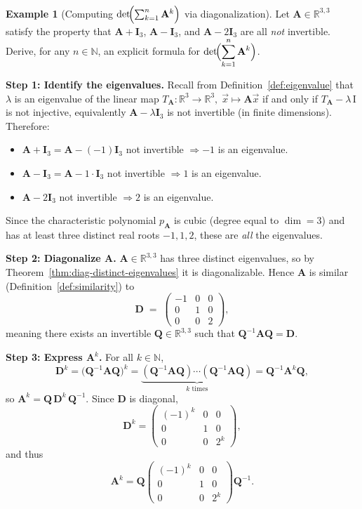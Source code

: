 \documentclass[11pt, a4paper, notitlepage]{report}
\theoremstyle{definition}
\newtheorem{example}[theorem]{Example}
\theoremstyle{remark}
\begin{document}
\begin{example}[Computing $\det\!\Bigl(\sum_{k=1}^n \mathbf{A}^k\Bigr)$ via diagonalization]
\label{ex:det-sum-diag}
Let $\mathbf{A} \in \mathbb{R}^{3,3}$ satisfy the property that
$\mathbf{A} + \mathbf{I}_3$, $\mathbf{A} - \mathbf{I}_3$, and
$\mathbf{A} - 2\mathbf{I}_3$ are all \emph{not} invertible.
Derive, for any $n \in \mathbb{N}$, an explicit formula for
$\det\!\Bigl(\displaystyle\sum_{k=1}^n \mathbf{A}^k\Bigr)$.

\medskip
\textbf{Step 1: Identify the eigenvalues.}
Recall from Definition~\ref{def:eigenvalue} that $\lambda$ is an eigenvalue of
the linear map $T_{\mathbf{A}} : \mathbb{R}^3 \to \mathbb{R}^3,\; \vec{x} \mapsto \mathbf{A}\vec{x}$
if and only if $T_{\mathbf{A}} - \lambda\,\mathrm{I}$ is not injective, equivalently $\mathbf{A} - \lambda\mathbf{I}_3$
is not invertible (in finite dimensions).  Therefore:
\begin{itemize}
  \item $\mathbf{A} + \mathbf{I}_3 = \mathbf{A} - (-1)\mathbf{I}_3$ not invertible $\Rightarrow -1$ is an eigenvalue.
  \item $\mathbf{A} - \mathbf{I}_3 = \mathbf{A} - 1\cdot\mathbf{I}_3$ not invertible $\Rightarrow 1$ is an eigenvalue.
  \item $\mathbf{A} - 2\mathbf{I}_3$ not invertible $\Rightarrow 2$ is an eigenvalue.
\end{itemize}
Since the characteristic polynomial $p_{\mathbf{A}}$ is cubic (degree equal to $\dim = 3$) and
has at least three distinct real roots $-1, 1, 2$, these are \emph{all} the eigenvalues.

\medskip
\textbf{Step 2: Diagonalize $\mathbf{A}$.}
$\mathbf{A} \in \mathbb{R}^{3,3}$ has three distinct eigenvalues, so by
Theorem~\ref{thm:diag-distinct-eigenvalues} it is diagonalizable.
Hence $\mathbf{A}$ is similar (Definition~\ref{def:similarity}) to
\[
  \mathbf{D} \;=\; \begin{pmatrix} -1 & 0 & 0 \\ 0 & 1 & 0 \\ 0 & 0 & 2 \end{pmatrix},
\]
meaning there exists an invertible $\mathbf{Q} \in \mathbb{R}^{3,3}$ such that
$\mathbf{Q}^{-1}\mathbf{A}\mathbf{Q} = \mathbf{D}$.

\medskip
\textbf{Step 3: Express $\mathbf{A}^k$.}
For all $k \in \mathbb{N}$,
\[
  \mathbf{D}^k
  = \bigl(\mathbf{Q}^{-1}\mathbf{A}\mathbf{Q}\bigr)^k
  = \underbrace{(\mathbf{Q}^{-1}\mathbf{A}\mathbf{Q})\cdots(\mathbf{Q}^{-1}\mathbf{A}\mathbf{Q})}_{k\text{ times}}
  = \mathbf{Q}^{-1}\mathbf{A}^k\mathbf{Q},
\]
so $\mathbf{A}^k = \mathbf{Q}\,\mathbf{D}^k\,\mathbf{Q}^{-1}$.
Since $\mathbf{D}$ is diagonal,
\[
  \mathbf{D}^k
  = \begin{pmatrix} (-1)^k & 0 & 0 \\ 0 & 1 & 0 \\ 0 & 0 & 2^k \end{pmatrix},
\]
and thus
\[
  \mathbf{A}^k = \mathbf{Q}
  \begin{pmatrix} (-1)^k & 0 & 0 \\ 0 & 1 & 0 \\ 0 & 0 & 2^k \end{pmatrix}
  \mathbf{Q}^{-1}.
\]


\end{example}
\end{document}
